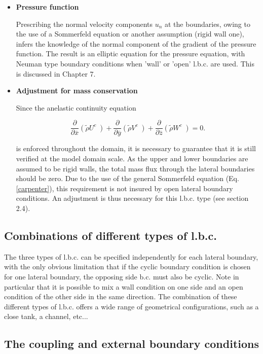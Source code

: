\begin{itemize}
\item {\bf Pressure function}

Prescribing the normal velocity components $u_n$ at the boundaries, owing to
the use of a Sommerfeld equation or another assumption (rigid wall one),
infers the knowledge of the normal component of the gradient of the
pressure function. The result is an elliptic equation for the pressure
equation, with Neuman type boundary conditions when 'wall' or 'open'
l.b.c. are used. This is discussed in Chapter 7.

\item {\bf Adjustment for mass conservation}

Since the anelastic continuity equation

\begin{equation}
\label{continuity}
  \dfrac{\partial }{\partial \overline{x} } (\tilde{\rho} U^{c} \; )
+ \dfrac{\partial }{\partial \overline{y} } (\tilde{\rho} V^{c} \; )
+ \dfrac{\partial }{\partial \overline{z} } (\tilde{\rho} W^{c} \; ) =0.
\end{equation}

\noindent
is enforced throughout the domain,
it is necessary to guarantee that it is still verified at the model domain
scale. As the upper and lower boundaries are
assumed to be rigid walls, the total mass flux through the
lateral boundaries should be zero. Due to the use of the general Sommerfeld
equation (Eq. \ref{carpenter}), this requirement is not insured by open lateral boundary
conditions. An adjustment is thus necessary for this l.b.c. type (see section
2.4).


\end{itemize}

\subsection{Combinations of different types of l.b.c.}

 The three types of l.b.c. can be specified independently for each lateral
boundary, with the only obvious limitation that
if the cyclic boundary condition is chosen for one lateral boundary,
the opposing side b.c. must also be cyclic. Note in particular that it is
possible to mix a wall condition on one side and an open condition of the
other side in the same direction.
 The combination of these different types of l.b.c. offers
a wide range of geometrical configurations, such as a close tank, a
channel, etc...

\subsection{The coupling and external boundary conditions}

